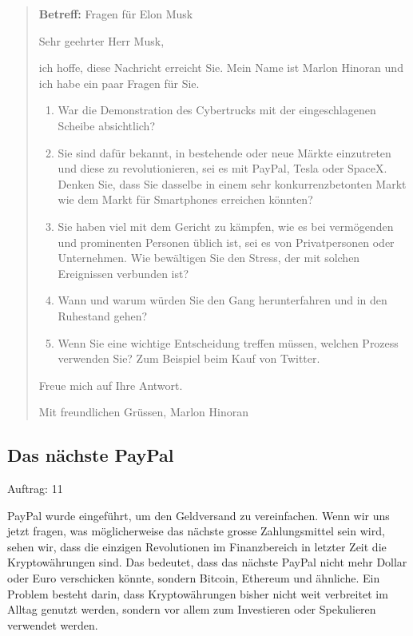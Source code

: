 \documentclass[10pt]{article}
\begin{document}
\begin{quote}
    \textbf{Betreff:} Fragen für Elon Musk
    
    Sehr geehrter Herr Musk,
    
    ich hoffe, diese Nachricht erreicht Sie. Mein Name ist Marlon Hinoran und ich habe ein paar Fragen für Sie.
    
    \begin{enumerate}
        \item War die Demonstration des Cybertrucks mit der eingeschlagenen Scheibe absichtlich?
        \item Sie sind dafür bekannt, in bestehende oder neue Märkte einzutreten und diese zu revolutionieren, sei es mit PayPal, Tesla oder SpaceX. Denken Sie, dass Sie dasselbe in einem sehr konkurrenzbetonten Markt wie dem Markt für Smartphones erreichen könnten?
        \item Sie haben viel mit dem Gericht zu kämpfen, wie es bei vermögenden und prominenten Personen üblich ist, sei es von Privatpersonen oder Unternehmen. Wie bewältigen Sie den Stress, der mit solchen Ereignissen verbunden ist?
        \item Wann und warum würden Sie den Gang herunterfahren und in den Ruhestand gehen?
        \item Wenn Sie eine wichtige Entscheidung treffen müssen, welchen Prozess verwenden Sie? Zum Beispiel beim Kauf von Twitter.
    \end{enumerate}
    
    Freue mich auf Ihre Antwort.
    
    Mit freundlichen Grüssen,
    Marlon Hinoran
\end{quote}

\subsection*{Das nächste PayPal}

\begin{description}
    \item[Auftrag: 11]
\end{description}

PayPal wurde eingeführt, um den Geldversand zu vereinfachen. Wenn wir uns jetzt fragen, was möglicherweise das nächste grosse Zahlungsmittel sein wird, sehen wir, dass die einzigen Revolutionen im Finanzbereich in letzter Zeit die Kryptowährungen sind. Das bedeutet, dass das nächste PayPal nicht mehr Dollar oder Euro verschicken könnte, sondern Bitcoin, Ethereum und ähnliche. Ein Problem besteht darin, dass Kryptowährungen bisher nicht weit verbreitet im Alltag genutzt werden, sondern vor allem zum Investieren oder Spekulieren verwendet werden.
\end{document}
